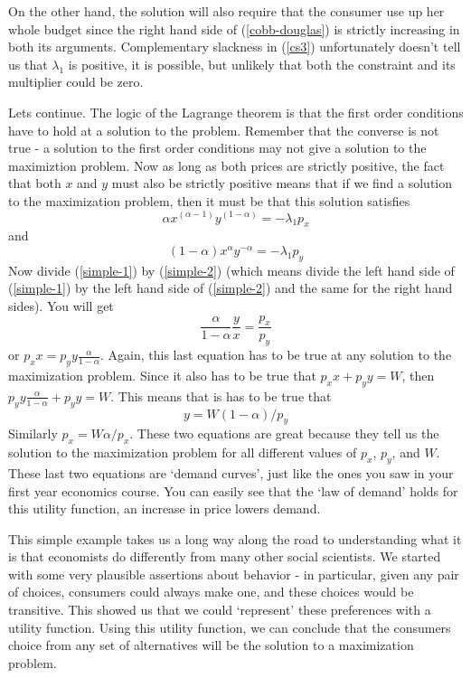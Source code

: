 \documentclass[12pt]{article}
\begin{document}
On the other hand, the solution will also require that the consumer use up
her whole budget since the right hand side of (\ref{cobb-douglas}) is strictly
increasing in both its arguments. Complementary slackness in (\ref{cs3})
unfortunately doesn't tell us that $\lambda_1$ is positive, it is possible,
but unlikely that both the constraint and its multiplier could be zero.

Lets continue. The logic of the Lagrange theorem is that the first order
conditions have to hold at a solution to the problem. Remember that the
converse is not true - a solution to the first order conditions may not give a
solution to the maximiztion problem. Now as long as both prices are strictly
positive, the fact that both $x$ and $y$ must also be strictly positive means
that if we find a solution to the maximization problem, then it must be that
this solution satisfies
\begin{equation}
  \alpha x^{( \alpha - 1 )} y^{( 1 - \alpha )} = - \lambda_1 p_x
  \label{simple-1}
\end{equation}
and
\begin{equation}
  ( 1 - \alpha ) x^{\alpha} y^{- \alpha} = - \lambda_1 p_y \label{simple-2}
\end{equation}
Now divide (\ref{simple-1}) by (\ref{simple-2}) (which means divide the left
hand side of (\ref{simple-1}) by the left hand side of (\ref{simple-2}) and
the same for the right hand sides). You will get
\begin{equation}
  \frac{\alpha}{1 - \alpha} \frac{y}{x} = \frac{p_x}{p_y}
\end{equation}
or $p_x x = p_y y \frac{\alpha}{1 - \alpha}$. Again, this last equation has to
be true at any solution to the maximization problem. Since it also has to be
true that $p_x x + p_y y = W$, then $p_y y \frac{\alpha}{1 - \alpha} + p_y y =
W$. This means that is has to be true that
\begin{equation}
  y = W ( 1 - \alpha ) / p_y \label{demand}
\end{equation}
Similarly $p_x = W \alpha / p_x$. These two equations are great because they
tell us the solution to the maximization problem for all different values of
$p_x$, $p_y$, and $W$. These last two equations are `demand curves', just like
the ones you saw in your first year economics course. You can easily see that
the `law of demand' holds for this utility function, an increase in price
lowers demand.

This simple example takes us a long way along the road to understanding what
it is that economists do differently from many other social scientists. We
started with some very plausible assertions about behavior - in particular,
given any pair of choices, consumers could always make one, and these choices
would be transitive. This showed us that we could `represent' these
preferences with a utility function. Using this utility function, we can
conclude that the consumers choice from any set of alternatives will be the
solution to a maximization problem.
\end{document}
